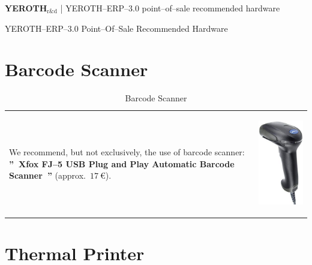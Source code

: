 \documentclass[12pt, a4paper]{article}
\newcommand{\yerothrd}{\textcolor{yerothColorGreen}
			{\textsc{\textcolor{yerothColorRed}{YEROTH}}$_{\text{r\&d}}$\xspace}}
\newcommand{\yerotherpblack}{YEROTH--ERP--$3.0$\xspace}
\newcommand{\money}[1]{$#1\ \euro{}$\xspace}
\begin{document}
{\bf \LARGE \yerothrd} {| \sc \scriptsize \yerotherpblack point--of--sale recommended hardware}

\vspace{2.5em}


\parbox{27em}{\LARGE \yerotherpblack Point--Of--Sale Recommended Hardware}

\vspace{1.0em}

\section{Barcode Scanner}
\vspace{-3.7em}

\begin{table}[!htbp]
\begin{tabular}{lr}
\parbox{25em}{
We recommend, but not exclusively, the use 
of barcode scanner:
\textbf{''~Xfox FJ--5 USB Plug and Play Automatic
Barcode Scanner~''} (approx.~\money{17}).
\vspace{-3em}
}

&

\parbox{17em}{
\begin{center}
\includegraphics[scale=0.2]{images/xfox-fj-5-usb-plug-and-play-automatic-barcode-scanner.png}
\caption*{Barcode Scanner}
\end{center}
}
\end{tabular}
\end{table}

\vspace{-0.8em}
\section{Thermal Printer}
\vspace{-2.7em}
\end{document}

